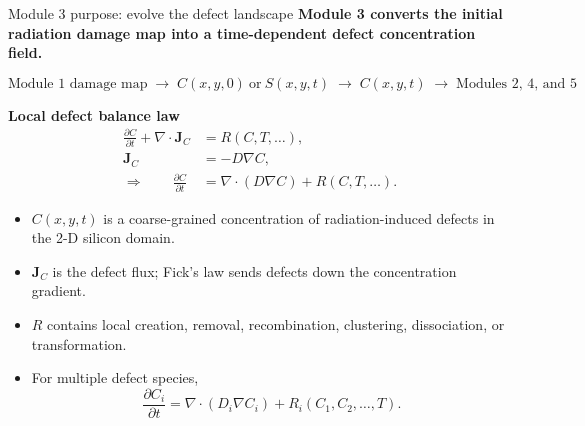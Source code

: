 \documentclass[aspectratio=169,10pt]{beamer}
\newcommand{\Jvec}{\mathbf{J}}
\begin{document}
\begin{frame}{Module 3 purpose: evolve the defect landscape}
\small
\textbf{Module 3 converts the initial radiation damage map into a time-dependent defect concentration field.}

\vspace{0.35em}
\begin{equation*}
\boxed{
\text{Module 1 damage map}
\;\longrightarrow\;
C(x,y,0)\ \text{or}\ S(x,y,t)
\;\longrightarrow\;
C(x,y,t)
\;\longrightarrow\;
\text{Modules 2, 4, and 5}
}
\end{equation*}

\vspace{0.25em}
\textbf{Local defect balance law}
\vspace{-0.25em}
\begin{align*}
\frac{\partial C}{\partial t}+\nabla\cdot\Jvec_C &= R(C,T,\ldots),\\[-0.15em]
\Jvec_C &=-D\nabla C,\\[-0.15em]
\Rightarrow\qquad
\frac{\partial C}{\partial t} &= \nabla\cdot(D\nabla C)+R(C,T,\ldots).
\end{align*}

\vspace{-0.15em}
\begin{itemize}
    \item $C(x,y,t)$ is a coarse-grained concentration of radiation-induced defects in the 2-D silicon domain.
    \item $\Jvec_C$ is the defect flux; Fick's law sends defects down the concentration gradient.
    \item $R$ contains local creation, removal, recombination, clustering, dissociation, or transformation.
    \item For multiple defect species,
    \[
        \frac{\partial C_i}{\partial t}
        =\nabla\cdot(D_i\nabla C_i)+R_i(C_1,C_2,\ldots,T).
    \]
\end{itemize}
\end{frame}
\end{document}
